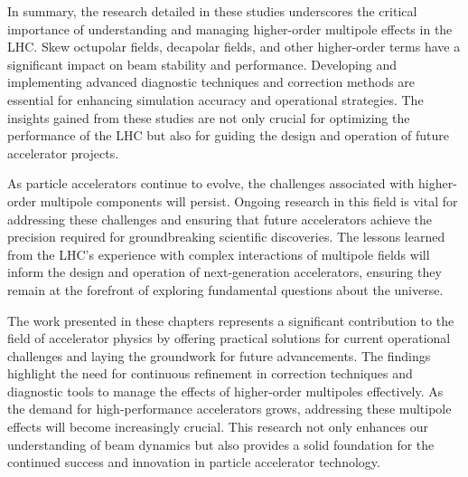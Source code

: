 {%
In summary, the research detailed in these studies underscores the critical importance of
understanding and managing higher-order multipole effects in the LHC. Skew octupolar fields,
decapolar fields, and other higher-order terms have a significant impact on beam stability and
performance. Developing and implementing advanced diagnostic techniques and correction methods are
essential for enhancing simulation accuracy and operational strategies. The insights gained from
these studies are not only crucial for optimizing the performance of the LHC but also for guiding
the design and operation of future accelerator projects.

As particle accelerators continue to evolve, the challenges associated with higher-order multipole
components will persist. Ongoing research in this field is vital for addressing these challenges and
ensuring that future accelerators achieve the precision required for groundbreaking scientific
discoveries. The lessons learned from the LHC's experience with complex interactions of multipole
fields will inform the design and operation of next-generation accelerators, ensuring they remain at
the forefront of exploring fundamental questions about the universe.

The work presented in these chapters represents a significant contribution to the field of
accelerator physics by offering practical solutions for current operational challenges and laying
the groundwork for future advancements. The findings highlight the need for continuous refinement in
correction techniques and diagnostic tools to manage the effects of higher-order multipoles
effectively. As the demand for high-performance accelerators grows, addressing these multipole
effects will become increasingly crucial. This research not only enhances our understanding of beam
dynamics but also provides a solid foundation for the continued success and innovation in particle
accelerator technology.

} %


\chapter{}

